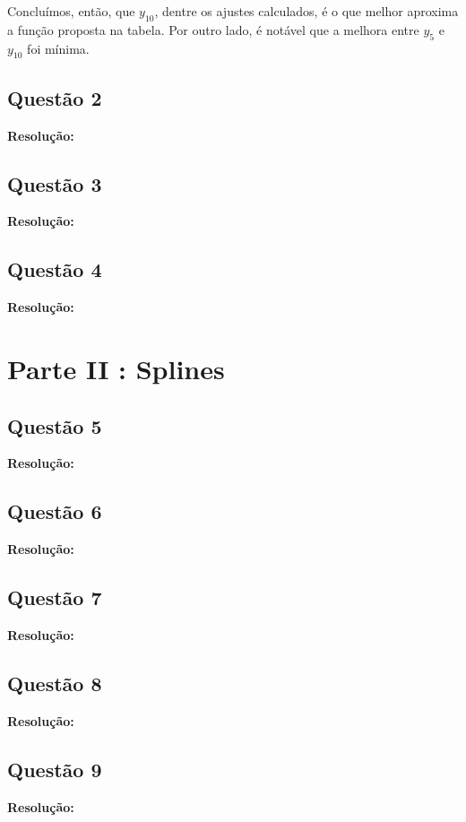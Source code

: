 \documentclass[12pt]{article}
\begin{document}
Concluímos, então, que $y_{10}$, dentre os ajustes calculados, é o que melhor aproxima a função proposta na tabela.
Por outro lado, é notável que a melhora entre $y_{5}$ e $y_{10}$ foi mínima.

\subsection{Questão 2}
\label{subsec:p1q2}

\textbf{Resolução:}

\subsection{Questão 3}
\label{subsec:p1q3}

\textbf{Resolução:}

\subsection{Questão 4}
\label{subsec:p1q4}

\textbf{Resolução:}

\section{Parte II : Splines}
\label{sec:parte2}

\subsection{Questão 5}
\label{subsec:p2q5}

\textbf{Resolução:}

\subsection{Questão 6}
\label{subsec:p2q6}

\textbf{Resolução:}

\subsection{Questão 7}
\label{subsec:p2q7}

\textbf{Resolução:}

\subsection{Questão 8}
\label{subsec:p2q8}

\textbf{Resolução:}

\subsection{Questão 9}
\label{subsec:p2q9}

\textbf{Resolução:}
\end{document}
